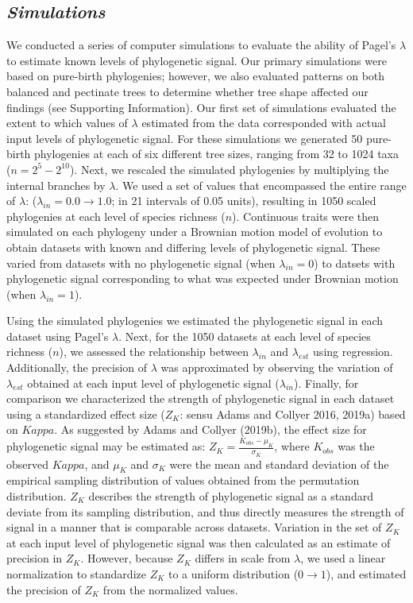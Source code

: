 \documentclass[
]{article}
\begin{document}
\hypertarget{simulations}{%
\subsection{\texorpdfstring{\emph{Simulations}}{Simulations}}\label{simulations}}

We conducted a series of computer simulations to evaluate the ability of
Pagel's \(\lambda\) to estimate known levels of phylogenetic signal. Our
primary simulations were based on pure-birth phylogenies; however, we
also evaluated patterns on both balanced and pectinate trees to
determine whether tree shape affected our findings (see Supporting
Information). Our first set of simulations evaluated the extent to which
values of \(\lambda\) estimated from the data corresponded with actual
input levels of phylogenetic signal. For these simulations we generated
50 pure-birth phylogenies at each of six different tree sizes, ranging
from 32 to 1024 taxa (\(n=2^5 - 2^{10}\)). Next, we rescaled the
simulated phylogenies by multiplying the internal branches by
\(\lambda\). We used a set of values that encompassed the entire range
of \(\lambda\): (\(\lambda_{in} = 0.0 \to 1.0\); in 21 intervals of 0.05
units), resulting in 1050 scaled phylogenies at each level of species
richness (\(n\)). Continuous traits were then simulated on each
phylogeny under a Brownian motion model of evolution to obtain datasets
with known and differing levels of phylogenetic signal. These varied
from datasets with no phylogenetic signal (when \(\lambda_{in} =0\)) to
datsets with phylogenetic signal corresponding to what was expected
under Brownian motion (when \(\lambda_{in} =1\)). \hfill\break

Using the simulated phylogenies we estimated the phylogenetic signal in
each dataset using Pagel's \(\lambda\). Next, for the 1050 datasets at
each level of species richness (\(n\)), we assessed the relationship
between \(\lambda_{in}\) and \(\lambda_{est}\) using regression.
Additionally, the precision of \(\lambda\) was approximated by observing
the variation of \(\lambda_{est}\) obtained at each input level of
phylogenetic signal (\(\lambda_{in}\)). Finally, for comparison we
characterized the strength of phylogenetic signal in each dataset using
a standardized effect size (\(Z_K\): sensu Adams and Collyer 2016,
2019a) based on \(Kappa\). As suggested by Adams and Collyer (2019b),
the effect size for phylogenetic signal may be estimated as:
\(Z_K=\frac{K_{obs}-\mu_K}{\sigma_K}\), where \(K_{obs}\) was the
observed \(Kappa\), and \(\mu_K\) and \(\sigma_K\) were the mean and
standard deviation of the empirical sampling distribution of values
obtained from the permutation distribution. \(Z_K\) describes the
strength of phylogenetic signal as a standard deviate from its sampling
distribution, and thus directly measures the strength of signal in a
manner that is comparable across datasets. Variation in the set of
\(Z_K\) at each input level of phylogenetic signal was then calculated
as an estimate of precision in \(Z_K\). However, because \(Z_K\) differs
in scale from \(\lambda\), we used a linear normalization to standardize
\(Z_K\) to a uniform distribution (\(0\rightarrow1\)), and estimated the
precision of \(Z_K\) from the normalized values. \hfill\break
\end{document}

